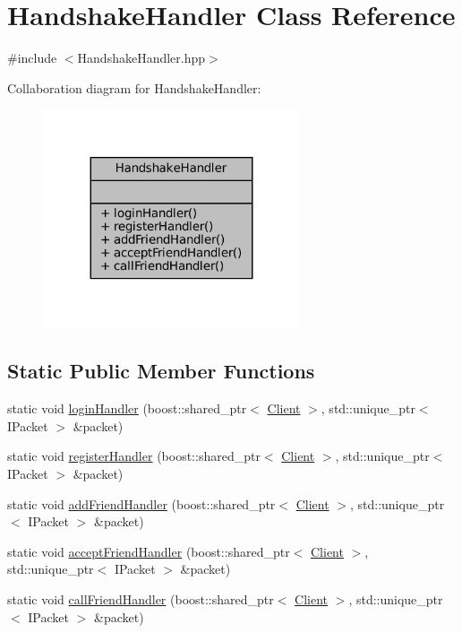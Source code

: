 \hypertarget{classHandshakeHandler}{}\section{Handshake\+Handler Class Reference}
\label{classHandshakeHandler}


{\ttfamily \#include $<$Handshake\+Handler.\+hpp$>$}



Collaboration diagram for Handshake\+Handler\+:
\nopagebreak
\begin{figure}[H]
\begin{center}
\leavevmode
\includegraphics[width=215pt]{classHandshakeHandler__coll__graph}
\end{center}
\end{figure}
\subsection*{Static Public Member Functions}
\begin{DoxyCompactItemize}
\item 
static void \mbox{\hyperlink{classHandshakeHandler_aef80330a36ad493211e1a4b2e321f3f1}{login\+Handler}} (boost\+::shared\+\_\+ptr$<$ \mbox{\hyperlink{classClient}{Client}} $>$, std\+::unique\+\_\+ptr$<$ I\+Packet $>$ \&packet)
\item 
static void \mbox{\hyperlink{classHandshakeHandler_a1a93aa1ce4f7ca634f89dce9f30d29d8}{register\+Handler}} (boost\+::shared\+\_\+ptr$<$ \mbox{\hyperlink{classClient}{Client}} $>$, std\+::unique\+\_\+ptr$<$ I\+Packet $>$ \&packet)
\item 
static void \mbox{\hyperlink{classHandshakeHandler_aa0ebcde41ffa598adaa99c6e55389344}{add\+Friend\+Handler}} (boost\+::shared\+\_\+ptr$<$ \mbox{\hyperlink{classClient}{Client}} $>$, std\+::unique\+\_\+ptr$<$ I\+Packet $>$ \&packet)
\item 
static void \mbox{\hyperlink{classHandshakeHandler_a943b521a7ffadc5e339b9c32ced09c67}{accept\+Friend\+Handler}} (boost\+::shared\+\_\+ptr$<$ \mbox{\hyperlink{classClient}{Client}} $>$, std\+::unique\+\_\+ptr$<$ I\+Packet $>$ \&packet)
\item 
static void \mbox{\hyperlink{classHandshakeHandler_adeaf54ffd2fa8a3b6b9eb60a458b56e0}{call\+Friend\+Handler}} (boost\+::shared\+\_\+ptr$<$ \mbox{\hyperlink{classClient}{Client}} $>$, std\+::unique\+\_\+ptr$<$ I\+Packet $>$ \&packet)
\end{DoxyCompactItemize}


